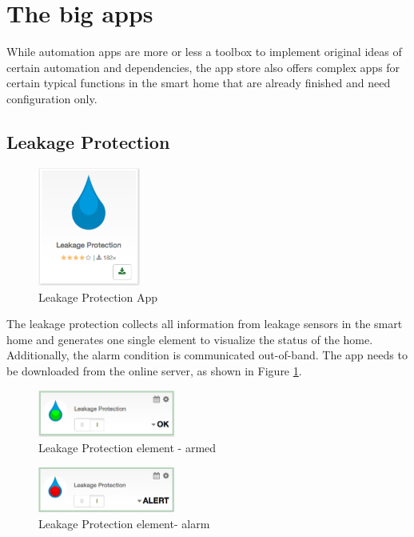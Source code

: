 \section{The big apps}

While automation apps are more or less a toolbox to implement original ideas of certain 
automation and dependencies, the app store also offers complex apps for certain typical 
functions in the smart home that are already finished and need configuration only.

\subsection{Leakage Protection}

\begin{figure}
\begin{center}
\includegraphics[width=0.3\textwidth]{pngs/cap6/app19.png}
\caption{Leakage Protection App}
\label{app19}
\end{center}
\end{figure}

The leakage protection collects all information from leakage sensors in the smart home and 
generates one single element to visualize the status of the home. Additionally, the alarm 
condition is communicated out-of-band. The app needs to be downloaded from the online 
server, as shown in Figure \ref{app19}.

\begin{figure}
\begin{center}
\includegraphics[width=0.4\textwidth]{pngs/cap6/app16.png}
\caption{Leakage Protection element - armed}
\label{app16}
\end{center}
\end{figure}

\begin{figure}
\begin{center}
\includegraphics[width=0.4\textwidth]{pngs/cap6/app17.png}
\caption{Leakage Protection element- alarm}
\label{app17}
\end{center}
\end{figure}


